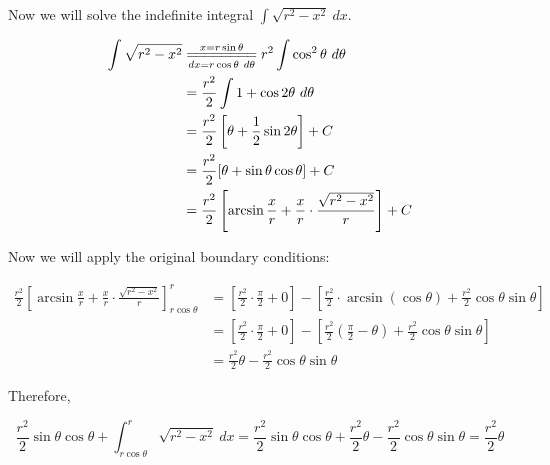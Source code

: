\documentclass{article}
\begin{document}
Now we will solve the indefinite integral $\int\sqrt{r^2-x^2}\ dx$.

\begin{align*}
\int\sqrt{r^2-x^2}&\overset{x=r\sin\theta}{\underset{dx=r\cos\theta\ d\theta}{=\joinrel=\joinrel=\joinrel=\joinrel=\joinrel=\joinrel=\joinrel=}}r^2\int\cos^2\theta\ d\theta\\
&=\frac{r^2}{2}\int1+\cos2\theta\ d\theta\\
&=\frac{r^2}{2}\left[\theta+\frac{1}{2}\sin2\theta\right]+C\\
&=\frac{r^2}{2}[\theta+\sin\theta\cos\theta]+C\\
&=\frac{r^2}{2}\left[\arcsin\frac{x}{r}+\frac{x}{r}\cdot\frac{\sqrt{r^2-x^2}}{r}\right]+C
\end{align*}

Now we will apply the original boundary conditions:

\begin{align*}
\frac{r^2}{2}\left[\arcsin\frac{x}{r}+\frac{x}{r}\cdot\frac{\sqrt{r^2-x^2}}{r}\right]_{r\cos\theta}^r&=\left[\frac{r^2}{2}\cdot\frac{\pi}{2}+0\right]-\left[\frac{r^2}{2}\cdot\arcsin(\cos\theta)+\frac{r^2}{2}\cos\theta\sin\theta\right]\\
&=\left[\frac{r^2}{2}\cdot\frac{\pi}{2}+0\right]-\left[\frac{r^2}{2}\left(\frac{\pi}{2}-\theta\right)+\frac{r^2}{2}\cos\theta\sin\theta\right]\\
&=\frac{r^2}{2}\theta-\frac{r^2}{2}\cos\theta\sin\theta
\end{align*}

Therefore,

\[\frac{r^2}{2}\sin\theta\cos\theta+\int_{r\cos\theta}^r\sqrt{r^2-x^2}\ dx=\frac{r^2}{2}\sin\theta\cos\theta+\frac{r^2}{2}\theta-\frac{r^2}{2}\cos\theta\sin\theta=\frac{r^2}{2}\theta\]
\end{document}
